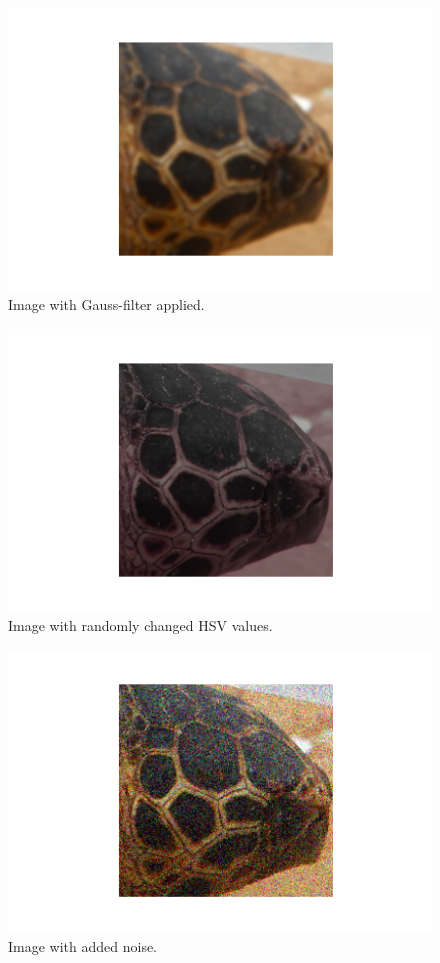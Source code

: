 \begin{figure}
    \centering
    \includegraphics{images/turtles/augmented/gaussian.png}
    \caption{Image with Gauss-filter applied.}
    \label{fig:turtleGauss}
\end{figure}

\begin{figure}
    \centering
    \includegraphics{images/turtles/augmented/hsv.png}
    \caption{Image with randomly changed HSV values.}
    \label{fig:turtleHSV}
\end{figure}

\begin{figure}
    \centering
    \includegraphics{images/turtles/augmented/noise.png}
    \caption{Image with added noise.}
    \label{fig:turtleNoise}
\end{figure}